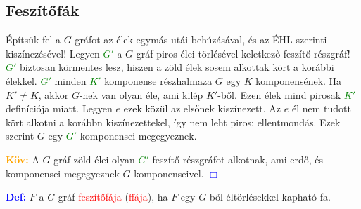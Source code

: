 \documentclass[../szamtud.tex]{subfiles}
\begin{document}
    
    

    \subsection{Feszítőfák}
    
        Építsük fel a $G$ gráfot az élek egymás utái behúzásával, és az ÉHL szerinti kiszínezésével! Legyen \textcolor{green}{$G'$} a $G$ gráf piros élei törlésével keletkező feszítő részgráf! \textcolor{green}{$G'$} biztosan körmentes lesz, hiszen a zöld élek sosem alkottak kört a korábbi élekkel. \textcolor{green}{$G'$} minden \textcolor{green}{$K'$} komponense részhalmaza $G$ egy $K$ komponensének. Ha $K' \neq K$, akkor $G$-nek van olyan éle, ami kilép $K'$-ből. Ezen élek mind pirosak \textcolor{green}{$K'$} definíciója miatt. Legyen $e$ ezek közül az elsőnek kiszínezett. Az $e$ él nem tudott kört alkotni a korábbn kiszínezettekel, így nem leht piros: ellentmondás. Ezek szerint $G$ egy \textcolor{green}{$G'$} komponensei megegyeznek.

        \textcolor{orange}{\textbf{Köv:}} A $G$ gráf zöld élei olyan \textcolor{green}{$G'$} feszítő részgráfot alkotnak, ami erdő, és komponensei megegyeznek $G$ komponenseivel. \textcolor{blue}{$\Box$} 

        \textcolor{blue}{\textbf{Def:}} $F$ a $G$ gráf \textcolor{red}{feszítőfája} (\textcolor{red}{ffája}), ha $F$ egy $G$-ből éltörlésekkel kapható fa.
\end{document}

